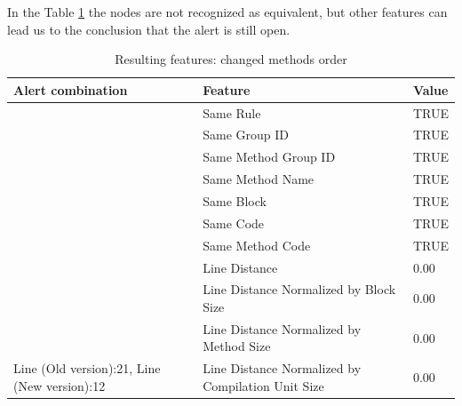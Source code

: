 \documentclass[
]{article}
\begin{document}
\newpage

In the Table \ref{changing_method_order} the nodes are not recognized as
equivalent, but other features can lead us to the conclusion that the
alert is still open.

\small

\begin{table}[!h]

\caption{\label{tab:unnamed-chunk-17}Resulting features: changed methods order \label{changing_method_order} }
\centering
\begin{tabular}[t]{l|l|l}
\hline
Alert combination & Feature & Value\\
\hline
\rowcolor{gray!6}   & Same Rule & TRUE\\

 & Same Group ID & TRUE\\

\rowcolor{gray!6}   & Same Method Group ID & TRUE\\

 & Same Method Name & TRUE\\

\rowcolor{gray!6}   & Same Block & TRUE\\

 & Same Code & TRUE\\

\rowcolor{gray!6}   & Same Method Code & TRUE\\

 & Line Distance & 0.00\\

\rowcolor{gray!6}   & Line Distance Normalized by Block Size & 0.00\\

 & Line Distance Normalized by Method Size & 0.00\\

\multirow[t]{-11}{*}{\raggedright\arraybackslash Line (Old version):21, Line (New version):12} & Line Distance Normalized by Compilation Unit Size & 0.00\\
\hline
\end{tabular}
\end{table}

\normalsize

\newpage
\end{document}
